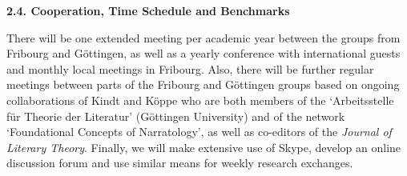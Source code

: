
\vspace{.4cm}
\noindent\textbf{2.4. Cooperation, Time Schedule and Benchmarks}
\vspace{.2cm}

\noindent There will be one extended meeting per academic year between the groups from Fribourg and G\"ottingen, as well as a yearly conference with international guests and monthly local meetings in Fribourg. Also, there will be further regular meetings between parts of the Fribourg and G\"ottingen groups based on ongoing collaborations of Kindt and K\"oppe who are both members of the `Arbeitsstelle f\"ur Theorie der Literatur' (G\"ottingen University) and of the network `Foundational Concepts of Narratology', as well as co-editors of the \emph{Journal of Literary Theory}. Finally, we will make extensive use of Skype, develop an online discussion forum and use similar means for weekly research exchanges.

